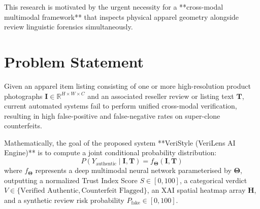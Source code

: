 \documentclass[a4paper,12pt]{report}
\begin{document}
This research is motivated by the urgent necessity for a **cross-modal multimodal framework** that inspects physical apparel geometry alongside review linguistic forensics simultaneously.

\section{Problem Statement}
Given an apparel item listing consisting of one or more high-resolution product photographs $\mathbf{I} \in \mathbb{R}^{H \times W \times C}$ and an associated reseller review or listing text $\mathbf{T}$, current automated systems fail to perform unified cross-modal verification, resulting in high false-positive and false-negative rates on super-clone counterfeits. 

Mathematically, the goal of the proposed system **VeriStyle (VeriLens AI Engine)** is to compute a joint conditional probability distribution:
\begin{equation}
    P(Y_{\text{authentic}} \mid \mathbf{I}, \mathbf{T}) = f_{\boldsymbol{\Theta}}(\mathbf{I}, \mathbf{T})
\end{equation}
where $f_{\boldsymbol{\Theta}}$ represents a deep multimodal neural network parameterised by $\boldsymbol{\Theta}$, outputting a normalized Trust Index Score $S \in [0, 100]$, a categorical verdict $V \in \{\text{Verified Authentic}, \text{Counterfeit Flagged}\}$, an XAI spatial heatmap array $\mathbf{H}$, and a synthetic review risk probability $P_{\text{fake}} \in [0, 100]$.
\end{document}

